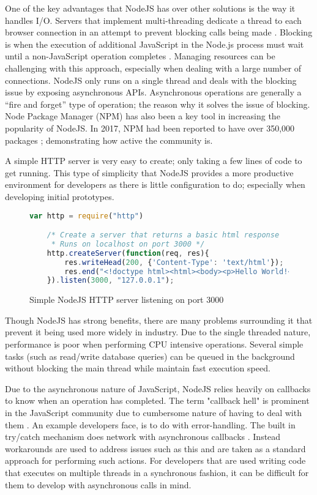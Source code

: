 One of the key advantages that NodeJS has over other solutions is the way it handles I/O.
Servers that implement multi-threading dedicate a thread to each browser connection in an attempt to prevent blocking calls being made \cite{frees2015place}.
Blocking is when the execution of additional JavaScript in the Node.js process must wait until a non-JavaScript operation completes \cite{nodejs2019blocking}. 
Managing resources can be challenging with this approach, especially when dealing with a large number of connections.
NodeJS only runs on a single thread and deals with the blocking issue by exposing asynchronous APIs.
Asynchronous operations are generally a ``fire and forget'' type of operation; the reason why it solves the issue of blocking.
Node Package Manager (NPM) has also been a key tool in increasing the popularity of NodeJS.
In 2017, NPM had been reported to have over 350,000 packages \cite{linux2016stateofnpm}; demonstrating how active the community is.

A simple HTTP server is very easy to create; only taking a few lines of code to get running. 
This type of simplicity that NodeJS provides a more productive environment for developers as there is little configuration to do;
especially when developing initial prototypes.

\begin{figure}[htb]
    \begin{lstlisting}[language=JavaScript]
    var http = require("http")

    /* Create a server that returns a basic html response
     * Runs on localhost on port 3000 */
    http.createServer(function(req, res){
        res.writeHead(200, {'Content-Type': 'text/html'});
        res.end("<!doctype html><html><body><p>Hello World!</p></body></html>");
    }).listen(3000, "127.0.0.1");
    \end{lstlisting}
    \caption{Simple NodeJS HTTP server listening on port 3000}
\end{figure}

Though NodeJS has strong benefits, there are many problems surrounding it that prevent it being used more widely in industry.
Due to the single threaded nature, performance is poor when performing CPU intensive operations.
Several simple tasks (such as read/write database queries) can be queued in the background without blocking the main thread while
maintain fast execution speed. 

Due to the asynchronous nature of JavaScript, NodeJS relies heavily on callbacks to know when an operation has completed.
The term "callback hell" is prominent in the JavaScript community due to cumbersome nature of having to deal with them \cite{altexsoftnodejs}.
An example developers face, is to do with error-handling. The built in try/catch mechanism does network with asynchronous callbacks \cite{gallaba2015don}.
Instead workarounds are used to address issues such as this and are taken as a standard approach for performing such actions.
For developers that are used writing code that executes on multiple threads in a synchronous fashion, it can be difficult for them to
develop with asynchronous calls in mind.

